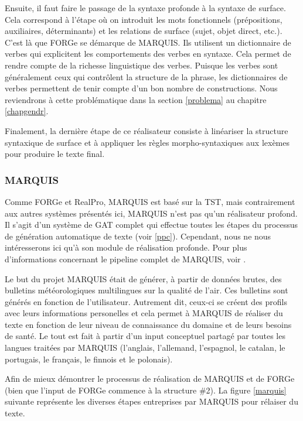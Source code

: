 Ensuite, il faut faire le passage de la syntaxe profonde à la syntaxe de surface. Cela correspond à l'étape où on introduit les mots fonctionnels (prépositions, auxiliaires, déterminants) et les relations de surface (sujet, objet direct, etc.). C'est là que FORGe se démarque de MARQUIS. Ils utilisent un dictionnaire de verbes qui explicitent les comportements des verbes en syntaxe. Cela permet de rendre compte de la richesse linguistique des verbes. Puisque les verbes sont généralement ceux qui contrôlent la structure de la phrase, les dictionnaires de verbes permettent de tenir compte d'un bon nombre de constructions. Nous reviendrons à cette problématique dans la section \ref{problema} au chapitre \ref{chapgendr}.

Finalement, la dernière étape de ce réalisateur consiste à linéariser la structure syntaxique de surface et à appliquer les règles morpho-syntaxiques aux lexèmes pour produire le texte final.

\subsubsection{MARQUIS}\label{sectionmarquis}
Comme FORGe et RealPro, MARQUIS est basé sur la \ac{TST}, mais contrairement aux autres systèmes présentés ici, MARQUIS n'est pas qu'un réalisateur profond. Il s'agit d'un système de \ac{GAT} complet qui effectue toutes les étapes du processus de génération automatique de texte (voir \ref{ppc}). Cependant, nous ne nous intéresserons ici qu'à son module de réalisation profonde. Pour plus d'informations concernant le pipeline complet de MARQUIS, voir \citep{WannerMARQUISGENERATIONUSERTAILORED2010}. 

Le but du projet MARQUIS était de générer, à partir de données brutes, des bulletins météorologiques multilingues sur la qualité de l'air. Ces bulletins sont générés en fonction de l'utilisateur. Autrement dit, ceux-ci se créent des profils avec leurs informations personelles et cela permet à MARQUIS de réaliser du texte en fonction de leur niveau de connaissance du domaine et de leurs besoins de santé. Le tout est fait à partir d'un input conceptuel partagé par toutes les langues traitées par MARQUIS (l'anglais, l'allemand, l'espagnol, le catalan, le portugais, le français, le finnois et le polonais). 

Afin de mieux démontrer le processus de réalisation de MARQUIS et de FORGe (bien que l'input de FORGe commence à la structure \#2). La figure \ref{marquis} suivante représente les diverses étapes entreprises par MARQUIS pour rélaiser du texte.

